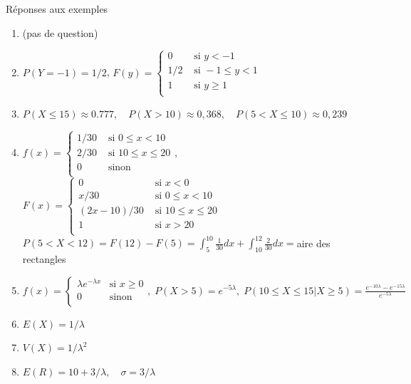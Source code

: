 \documentclass[handout]{BeamerTemplate}
\begin{document}
\begin{frame}[t]{Réponses aux exemples}

\scriptsize
\begin{enumerate}
  \item (pas de question)
  \item $P(Y=-1)=1/2$, $F(y)=\left\{
      \begin{array}{ll}
      0 & \text{ si } y<-1\\
      1/2 & \text{ si } -1\leq y<1\\
      1 & \text{ si } y\geq 1\\
      \end{array}\right.$
  \item $P(X\leq 15)\approx0.777,\quad P(X> 10)\approx 0,368, \quad P(5<X\leq 10)\approx 0,239$
  \item $f(x)=\left\{
      \begin{array}{ll}
      1/30 & \text{ si } 0\leq x <10\\
      2/30 & \text{ si } 10\leq x\leq20\\
      0 & \text{ sinon }\\
      \end{array}\right.$, $F(x)=\left\{
      \begin{array}{ll}
      0 & \text{ si } x<0\\
      x/30 & \text{ si } 0\leq x <10\\
      (2x-10)/30 & \text{ si }  10\leq x \leq20\\
      1 & \text{ si } x>20\\
      \end{array}\right.$
      $P(5<X<12)=F(12)-F(5)=\displaystyle\int_5^{10}\frac{1}{30}dx+\int_{10}^{12}\frac{2}{30}dx=$aire des  rectangles
  \item $f(x)=\left\{
      \begin{array}{ll}
      \lambda e^{-\lambda x} & \text{si }  x \geq 0\\
      0 & \text{sinon }\\
      \end{array}\right.,\; P(X>5)=e^{-5\lambda},\; P(10\leq X\leq 15|X\geq5)=\frac{e^{-10\lambda}-e^{-15\lambda}}{e^{-5\lambda}}$
  \item $E(X)=1/\lambda$
  \item $V(X)=1/\lambda^2$
  \item $E(R)=10+3/\lambda,\quad \sigma=3/\lambda$
 \end{enumerate}
\end{frame}
\end{document}
